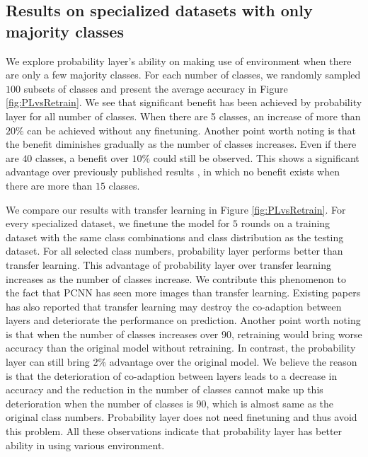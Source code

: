 \documentclass[pageno]{jpaper}
\begin{document}
\subsection{Results on specialized datasets with only majority classes}


We explore probability layer's ability on making use of environment when there are only a few majority classes. For each number of classes, we randomly sampled $100$ subsets of classes and present the average accuracy in Figure \ref{fig:PLvsRetrain}. We see that significant benefit has been achieved by probability layer for all number of classes. When there are 5 classes, an increase of more than $20\%$ can be achieved without any finetuning. Another point worth noting is that the benefit diminishes gradually as the number of classes increases. Even if there are $40$ classes, a benefit over $10\%$ could still be observed. This shows a significant advantage over previously published results \cite{shen2016fast}, in which no benefit exists when there are more than $15$ classes.
 
We compare our results with transfer learning in Figure \ref{fig:PLvsRetrain}. For every specialized dataset, we finetune the model for $5$ rounds on a training dataset with the same class combinations and class distribution as the testing dataset. For all selected class numbers, probability layer performs better than transfer learning. This advantage of probability layer over transfer learning increases as the number of classes increase. We contribute this phenomenon to the fact that PCNN has seen more images than transfer learning. Existing papers \cite{yosinski2014transferable} has also reported that transfer learning may destroy the co-adaption between layers and deteriorate the performance on prediction. Another point worth noting is that when the number of classes increases over $90$, retraining would bring worse accuracy than the original model without retraining. In contrast, the probability layer can still bring 2\% advantage over the original model. We believe the reason is that the deterioration of co-adaption between layers leads to a decrease in accuracy and the reduction in the number of classes cannot make up this deterioration when the number of classes is $90$, which is almost same as the original class numbers. Probability layer does not need finetuning and thus avoid this problem. All these observations indicate that probability layer has better ability in using various environment.
\end{document}
